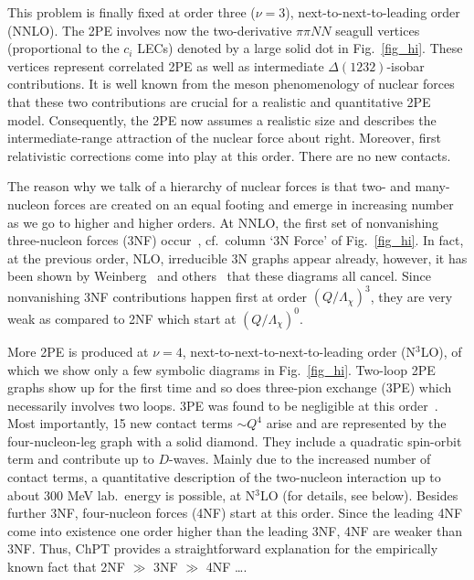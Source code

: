 \documentclass[sort&compress,preprint,3p]{elsarticle}
\begin{document}
This problem is finally fixed at order three 
($\nu=3$), next-to-next-to-leading order (NNLO).
The 2PE involves now the two-derivative
$\pi\pi NN$ seagull vertices (proportional to
the $c_i$ LECs) denoted by a large solid dot
in Fig.~\ref{fig_hi}.
These vertices represent correlated 2PE
as well as intermediate $\Delta(1232)$-isobar contributions.
It is well known from the meson phenomenology of 
nuclear forces~\cite{MHE87,Lac80}
that these two contributions are crucial
for a realistic and quantitative 2PE model.
Consequently, the 2PE now assumes a realistic size
and describes the intermediate-range attraction of the
nuclear force about right. Moreover, first relativistic 
corrections come into play at this order.
There are no new contacts.

The reason why we talk of a hierarchy of nuclear forces is that 
two- and many-nucleon forces are created on an equal footing
and emerge in increasing number as we go to higher and higher orders.
At NNLO, the first set of
nonvanishing three-nucleon forces (3NF) occur~\cite{Kol94,Epe02b},
cf.\ column `3N Force' of
Fig.~\ref{fig_hi}. 
In fact, at the previous order, NLO,
irreducible 3N graphs appear already, however,
it has been shown by Weinberg~\cite{Wei92} and 
others~\cite{Kol94,YG86,CF86} that these diagrams all cancel.
Since nonvanishing 3NF contributions happen first
at order 
$(Q/\Lambda_\chi)^3$, 
they are very weak as compared to 2NF which start at
$(Q/\Lambda_\chi)^0$.

More 2PE is produced at $\nu =4$, next-to-next-to-next-to-leading
order (N$^3$LO), of which we show only a few symbolic diagrams in 
Fig.~\ref{fig_hi}. 
Two-loop 2PE
graphs show up for the first time and so does
three-pion exchange (3PE) which necessarily involves
two loops.
3PE was found to be negligible at this order~\cite{Kai00a,Kai00b}.
Most importantly, 15 new contact terms $\sim Q^4$
arise and are represented 
by the four-nucleon-leg graph with a solid diamond.
They include a quadratic spin-orbit term and
contribute up to $D$-waves.
Mainly due to the increased number of contact terms,
a quantitative description of the
two-nucleon interaction up to about 300 MeV
lab.\ energy is possible, 
at N$^3$LO 
(for details, see below).
Besides further 3NF,
four-nucleon forces (4NF) start
at this order. Since the leading 4NF 
come into existence one
order higher than the leading 3NF, 4NF are weaker
than 3NF.
Thus, ChPT provides a straightforward explanation for
the empirically known fact that 2NF $\gg$ 3NF $\gg$ 4NF
\ldots.
\end{document}
